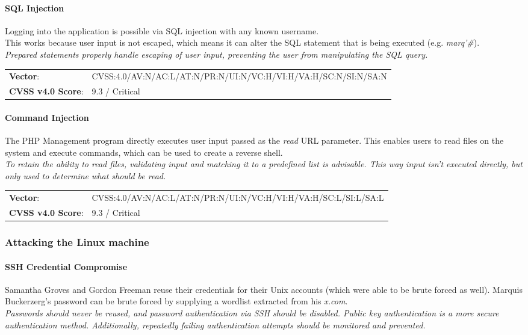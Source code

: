 \documentclass[../report.tex]{subfiles}
\begin{document}
\paragraph{SQL Injection}
Logging into the application is possible via SQL injection with any known username.\\
This works because user input is not escaped, which means it can alter the SQL statement that is being executed (e.g. \textit{marq'\#}).\\
\textit{Prepared statements properly handle escaping of user input, preventing the user from manipulating the SQL query.}

\begin{tabular}{l l}
\textbf{Vector}: & CVSS:4.0/AV:N/AC:L/AT:N/PR:N/UI:N/VC:H/VI:H/VA:H/SC:N/SI:N/SA:N\\
\textbf{CVSS v4.0 Score}: & 9.3 / Critical\\
\end{tabular}

\paragraph{Command Injection}
The PHP Management program directly executes user input passed as the \textit{read} URL parameter. This enables users to read files on the system and execute commands, which can be used to create a reverse shell.\\
\textit{To retain the ability to read files, validating input and matching it to a predefined list is advisable. This way input isn't executed directly, but only used to determine what should be read.}

\begin{tabular}{l l}
\textbf{Vector}: & CVSS:4.0/AV:N/AC:L/AT:N/PR:N/UI:N/VC:H/VI:H/VA:H/SC:L/SI:L/SA:L\\
\textbf{CVSS v4.0 Score}: & 9.3 / Critical\\
\end{tabular}

\subsubsection{Attacking the Linux machine}

\paragraph{SSH Credential Compromise}
Samantha Groves and Gordon Freeman reuse their credentials for their Unix accounts (which were able to be brute forced as well). Marquis Buckerzerg's password can be brute forced by supplying a wordlist extracted from his \textit{x.com}.\\
\textit{Passwords should never be reused, and password authentication via SSH should be disabled. Public key authentication is a more secure authentication method. Additionally, repeatedly failing authentication attempts should be monitored and prevented.}
\end{document}
